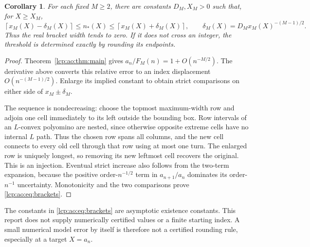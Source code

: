 \documentclass[11pt]{article}
\numberwithin{equation}{section}
\newtheorem{corollary}[theorem]{Corollary}
\theoremstyle{definition}\newtheorem{definition}[theorem]{Definition}
\theoremstyle{remark}\newtheorem{remark}[theorem]{Remark}
\begin{document}
\begin{corollary}\label{lcp:ao:cor:brackets}
For each fixed $M\ge2$, there are constants $D_M,X_M>0$ such that, for $X\ge X_M$,
\begin{equation}\label{lcp:ao:eq:brackets}
\left\lceil x_M(X)-\delta_M(X)\right\rceil
\le n_*(X)\le
\left\lceil x_M(X)+\delta_M(X)\right\rceil,
\qquad
\delta_M(X)=D_Mx_M(X)^{-(M-1)/2}.
\end{equation}
Thus the real bracket width tends to zero. If it does not cross an integer, the threshold is determined exactly by rounding its endpoints.
\end{corollary}
\begin{proof}
Theorem~\ref{lcp:ao:thm:main} gives $a_n/F_M(n)=1+O(n^{-M/2})$. The derivative above converts this relative error to an index displacement $O(n^{-(M-1)/2})$. Enlarge its implied constant to obtain strict comparisons on either side of $x_M\pm\delta_M$.

The sequence is nondecreasing: choose the topmost maximum-width row and adjoin one cell immediately to its left outside the bounding box. Row intervals of an $L$-convex polyomino are nested, since otherwise opposite extreme cells have no internal $L$ path. Thus the chosen row spans all columns, and the new cell connects to every old cell through that row using at most one turn. The enlarged row is uniquely longest, so removing its new leftmost cell recovers the original. This is an injection. Eventual strict increase also follows from the two-term expansion, because the positive order-$n^{-1/2}$ term in $a_{n+1}/a_n$ dominates its order-$n^{-1}$ uncertainty. Monotonicity and the two comparisons prove \eqref{lcp:ao:eq:brackets}.
\end{proof}
The constants in \eqref{lcp:ao:eq:brackets} are asymptotic existence constants. This report does not supply numerically certified values or a finite starting index. A small numerical model error by itself is therefore not a certified rounding rule, especially at a target $X=a_n$.
\end{document}

